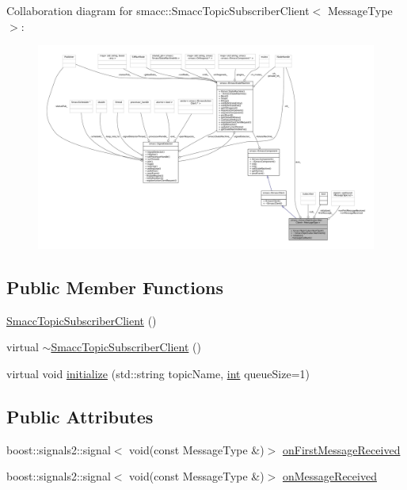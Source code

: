 Collaboration diagram for smacc\+:\+:Smacc\+Topic\+Subscriber\+Client$<$ Message\+Type $>$\+:
\nopagebreak
\begin{figure}[H]
\begin{center}
\leavevmode
\includegraphics[width=350pt]{classsmacc_1_1SmaccTopicSubscriberClient__coll__graph}
\end{center}
\end{figure}
\subsection*{Public Member Functions}
\begin{DoxyCompactItemize}
\item 
\hyperlink{classsmacc_1_1SmaccTopicSubscriberClient_a83128dcfa2531c5778c1f6940e6a190a}{Smacc\+Topic\+Subscriber\+Client} ()
\item 
virtual \hyperlink{classsmacc_1_1SmaccTopicSubscriberClient_afbedb6318483cdb945ce862ec33ab45d}{$\sim$\+Smacc\+Topic\+Subscriber\+Client} ()
\item 
virtual void \hyperlink{classsmacc_1_1SmaccTopicSubscriberClient_a8733cf96ffafbf778b9f2a337113f4f8}{initialize} (std\+::string topic\+Name, \hyperlink{classint}{int} queue\+Size=1)
\end{DoxyCompactItemize}
\subsection*{Public Attributes}
\begin{DoxyCompactItemize}
\item 
boost\+::signals2\+::signal$<$ void(const Message\+Type \&)$>$ \hyperlink{classsmacc_1_1SmaccTopicSubscriberClient_ac18bfc587bbaad6b150ce4bf9cdb56ed}{on\+First\+Message\+Received}
\item 
boost\+::signals2\+::signal$<$ void(const Message\+Type \&)$>$ \hyperlink{classsmacc_1_1SmaccTopicSubscriberClient_a4260d955152200804e9c51a1098965c8}{on\+Message\+Received}
\end{DoxyCompactItemize}
